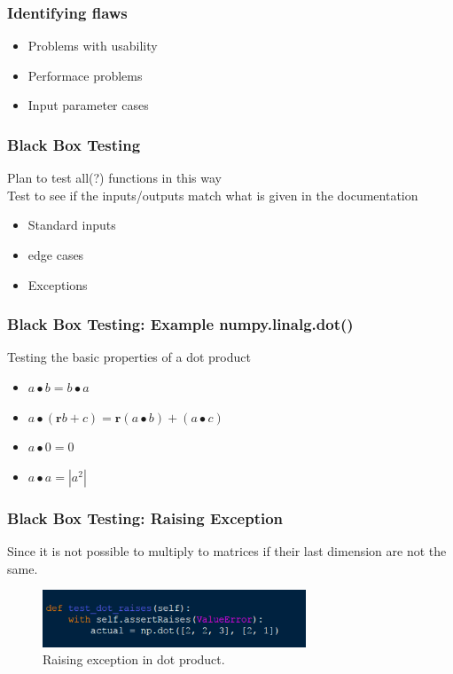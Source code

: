 \documentclass{beamer}
\begin{document}
\begin{frame}\frametitle{Identifying flaws} 
\begin{itemize}
\item Problems with usability
\item Performace problems
\item Input parameter cases
\end{itemize}
\end{frame}

\begin{frame}\frametitle{Black Box Testing} 
Plan to test all(?) functions in this way\\
Test to see if the inputs/outputs match what is given in the documentation
\begin{itemize}
\item Standard inputs
\item edge cases
\item Exceptions 
\end{itemize}
\end{frame}

\begin{frame}\frametitle{Black Box Testing: Example numpy.linalg.dot()} 
Testing the basic properties of a dot product 
\begin{itemize}
	\item $ a \bullet b = b \bullet a $
	\item $ a \bullet (\textbf{r}b + c) = \textbf{r}(a \bullet b) + (a \bullet c) $
	\\
	\item $ a \bullet 0 = 0 $
	\item $ a \bullet a = | a^2 |$
\end{itemize}
\end{frame}



\begin{frame}\frametitle{Black Box Testing: Raising Exception} 
Since it is not possible to multiply to matrices if their last dimension are not the same.
\begin{figure}[h]
	\centering
	\includegraphics[width=0.70\textwidth]{images/raises.png}
	\caption{Raising exception in dot product.}
	\label{fig:rai}
\end{figure}
\end{frame}
\end{document}
